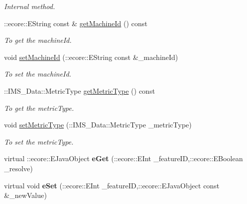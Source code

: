 \begin{DoxyCompactItemize}
\begin{DoxyCompactList}\small\item\em Internal method. \item\end{DoxyCompactList}\item 
::ecore::EString const \& \hyperlink{classIMS__Data_1_1ThresholdOp_ac7160b012f77164665573063fbe502a8}{getMachineId} () const 
\begin{DoxyCompactList}\small\item\em To get the machineId. \item\end{DoxyCompactList}\item 
void \hyperlink{classIMS__Data_1_1ThresholdOp_af1e4b71b6105713307dee3d2bbcc1142}{setMachineId} (::ecore::EString const \&\_\-machineId)
\begin{DoxyCompactList}\small\item\em To set the machineId. \item\end{DoxyCompactList}\item 
::IMS\_\-Data::MetricType \hyperlink{classIMS__Data_1_1ThresholdOp_aa43804f6577d2f30222f97db955aee4f}{getMetricType} () const 
\begin{DoxyCompactList}\small\item\em To get the metricType. \item\end{DoxyCompactList}\item 
void \hyperlink{classIMS__Data_1_1ThresholdOp_a4664121a2fd1f4e7a67250b1fddcbd77}{setMetricType} (::IMS\_\-Data::MetricType \_\-metricType)
\begin{DoxyCompactList}\small\item\em To set the metricType. \item\end{DoxyCompactList}\item 
\hypertarget{classIMS__Data_1_1ThresholdOp_a944c21d2e91c8bbbecd6bd443f94f1bc}{
virtual ::ecore::EJavaObject {\bfseries eGet} (::ecore::EInt \_\-featureID,::ecore::EBoolean \_\-resolve)}
\label{classIMS__Data_1_1ThresholdOp_a944c21d2e91c8bbbecd6bd443f94f1bc}

\item 
\hypertarget{classIMS__Data_1_1ThresholdOp_ae8b14f259a7f5a4676bd0dce82e1ced0}{
virtual void {\bfseries eSet} (::ecore::EInt \_\-featureID,::ecore::EJavaObject const \&\_\-newValue)}
\label{classIMS__Data_1_1ThresholdOp_ae8b14f259a7f5a4676bd0dce82e1ced0}


\end{DoxyCompactItemize}
